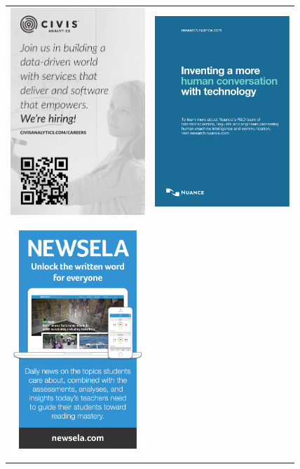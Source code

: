 \thispagestyle{empty}
\begin{tabular*}{\textwidth}{@{\extracolsep{\fill}} ll }
\includegraphics[width=2in]{content/ads/ads/civis_quarter_page}
& \includegraphics[width=2in]{content/ads/ads/nuance_quarter_page}\\
\includegraphics[width=2in]{content/ads/ads/newsela_quarter_page}

\end{tabular*}
